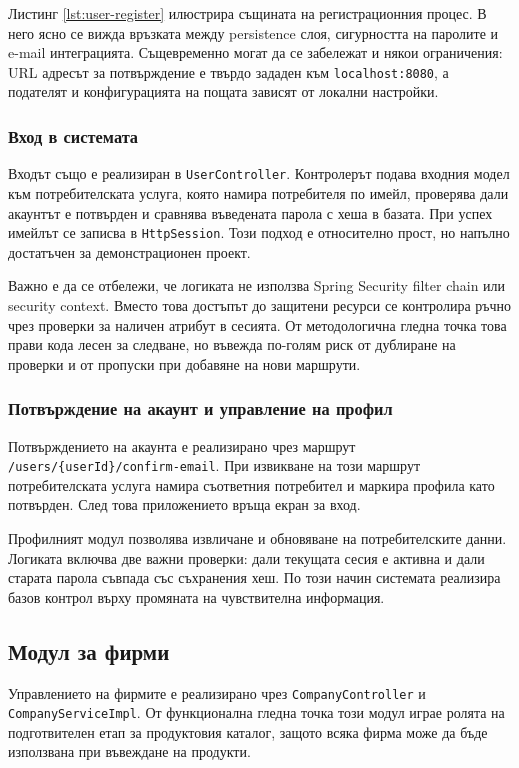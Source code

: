 Листинг \ref{lst:user-register} илюстрира същината на регистрационния процес. В него ясно се вижда връзката между persistence слоя, сигурността на паролите и e-mail интеграцията. Същевременно могат да се забележат и някои ограничения: URL адресът за потвърждение е твърдо зададен към \texttt{localhost:8080}, а подателят и конфигурацията на пощата зависят от локални настройки.

\subsubsection{Вход в системата}

Входът също е реализиран в \texttt{UserController}. Контролерът подава входния модел към потребителската услуга, която намира потребителя по имейл, проверява дали акаунтът е потвърден и сравнява въведената парола с хеша в базата. При успех имейлът се записва в \texttt{HttpSession}. Този подход е относително прост, но напълно достатъчен за демонстрационен проект.

Важно е да се отбележи, че логиката не използва Spring Security filter chain или security context. Вместо това достъпът до защитени ресурси се контролира ръчно чрез проверки за наличен атрибут в сесията. От методологична гледна точка това прави кода лесен за следване, но въвежда по-голям риск от дублиране на проверки и от пропуски при добавяне на нови маршрути.

\subsubsection{Потвърждение на акаунт и управление на профил}

Потвърждението на акаунта е реализирано чрез маршрут \texttt{/users/\{userId\}/confirm-email}. При извикване на този маршрут потребителската услуга намира съответния потребител и маркира профила като потвърден. След това приложението връща екран за вход.

Профилният модул позволява извличане и обновяване на потребителските данни. Логиката включва две важни проверки: дали текущата сесия е активна и дали старата парола съвпада със съхранения хеш. По този начин системата реализира базов контрол върху промяната на чувствителна информация.

\subsection{Модул за фирми}

Управлението на фирмите е реализирано чрез \texttt{CompanyController} и \texttt{CompanyServiceImpl}. От функционална гледна точка този модул играе ролята на подготвителен етап за продуктовия каталог, защото всяка фирма може да бъде използвана при въвеждане на продукти.

